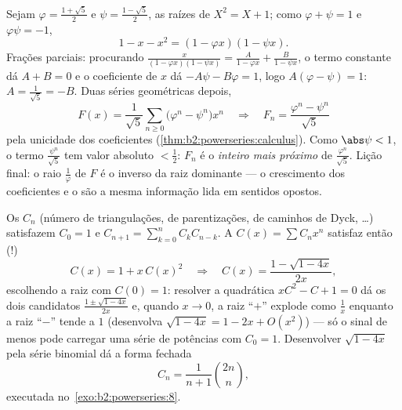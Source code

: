 \begin{example}\label{ex:b2:powerseries:binet}
Sejam $\varphi = \frac{1+\sqrt5}{2}$ e $\psi =
\frac{1-\sqrt5}{2}$, as raízes de $X^2 = X + 1$; como $\varphi
+ \psi = 1$ e $\varphi\psi = -1$,
\[
1 - x - x^2 = (1 - \varphi x)(1 - \psi x) .
\]
Frações parciais: procurando $\frac{x}{(1-\varphi x)(1-\psi x)} =
\frac{A}{1 - \varphi x} + \frac{B}{1 - \psi x}$, o termo
constante dá $A + B = 0$ e o coeficiente de $x$ dá $-A\psi - B\varphi
= 1$, logo $A(\varphi - \psi) = 1$: $A = \frac{1}{\sqrt5} = -B$.
Duas séries geométricas depois,
\[
F(x) = \frac{1}{\sqrt5}\sum_{n\geq0}
\bigl(\varphi^n - \psi^n\bigr)x^n
\quad\Longrightarrow\quad
F_n = \frac{\varphi^n - \psi^n}{\sqrt5}
\]
pela unicidade dos coeficientes
(\cref{thm:b2:powerseries:calculus}). Como $\abs\psi < 1$, o
termo $\frac{\psi^n}{\sqrt5}$ tem valor absoluto $< \frac12$:
$F_n$ é o \emph{inteiro mais próximo} de
$\frac{\varphi^n}{\sqrt5}$. Lição final: o raio
$\frac1\varphi$ de $F$ é o inverso da raiz dominante
--- o crescimento dos coeficientes e o  são a
mesma informação lida em sentidos opostos.
\end{example}

\begin{example}\label{ex:b2:powerseries:catalan}
Os  $C_n$ (número de triangulações, de parentizações,
de caminhos de Dyck, \dots) satisfazem $C_0 = 1$ e $C_{n+1} = \sum_{k=0}^n
C_kC_{n-k}$. A  $C(x) = \sum C_nx^n$ satisfaz então (!)
\[
C(x) = 1 + x\,C(x)^2
\quad\Longrightarrow\quad
C(x) = \frac{1 - \sqrt{1 - 4x}}{2x} ,
\]
escolhendo a raiz com $C(0) = 1$: resolver a quadrática
$xC^2 - C + 1 = 0$ dá os dois candidatos $\frac{1 \pm
\sqrt{1-4x}}{2x}$ e, quando $x \to 0$, a raiz ``$+$'' explode
como $\frac1x$ enquanto a raiz ``$-$'' tende a $1$ (desenvolva
$\sqrt{1-4x} = 1 - 2x + O(x^2)$) --- só o sinal de menos pode
carregar uma série de potências com $C_0 = 1$. Desenvolver $\sqrt{1 - 4x}$ pela
série binomial dá a forma fechada
\[
C_n = \frac{1}{n+1}\binom{2n}{n} ,
\]
executada no~\cref{exo:b2:powerseries:8}.
\end{example}

